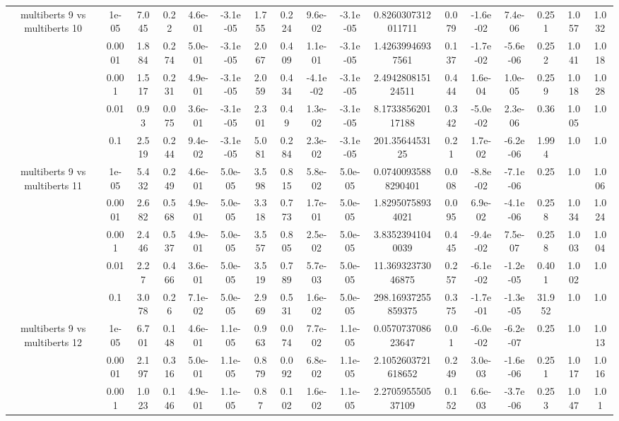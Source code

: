 \begin{tabular}{|c|c|c|c|c|c|c|c|c|c|c|c|c|c|c|c|c|}
\hline
\multirow{5}{*}{multiberts 9 vs multiberts 10} & 1e-05 & 7.045 & 0.22 & 4.6e-01 & -3.1e-05 & 1.755 & 0.224 & 9.6e-02 & -3.1e-05 & 0.8260307312011711 & 0.079 & -1.6e-02 & 7.4e-06 & 0.251 & 1.057 & 1.032 \\
 & 0.0001 & 1.884 & 0.274 & 5.0e-01 & -3.1e-05 & 2.067 & 0.409 & 1.1e-01 & -3.1e-05 & 1.42639946937561 & 0.137 & -1.7e-02 & -5.6e-06 & 0.252 & 1.041 & 1.018 \\
 & 0.001 & 1.517 & 0.231 & 4.9e-01 & -3.1e-05 & 2.059 & 0.434 & -4.1e-02 & -3.1e-05 & 2.494280815124511 & 0.444 & 1.6e-04 & 1.0e-05 & 0.259 & 1.018 & 1.028 \\
 & 0.01 & 0.93 & 0.075 & 3.6e-01 & -3.1e-05 & 2.301 & 0.49 & 1.3e-02 & -3.1e-05 & 8.173385620117188 & 0.342 & -5.0e-02 & 2.3e-06 & 0.36 & 1.005 & 1.0 \\
 & 0.1 & 2.519 & 0.244 & 9.4e-02 & -3.1e-05 & 5.081 & 0.284 & 2.3e-02 & -3.1e-05 & 201.3564453125 & 0.21 & 1.7e-02 & -6.2e-06 & 1.994 & 1.0 & 1.0 \\
\hline
\multirow{5}{*}{multiberts 9 vs multiberts 11} & 1e-05 & 5.432 & 0.249 & 4.6e-01 & 5.0e-05 & 3.598 & 0.815 & 5.8e-02 & 5.0e-05 & 0.07400935888290401 & 0.008 & -8.8e-02 & -7.1e-06 & 0.25 & 1.0 & 1.006 \\
 & 0.0001 & 2.682 & 0.568 & 4.9e-01 & 5.0e-05 & 3.318 & 0.773 & 1.7e-01 & 5.0e-05 & 1.82950758934021 & 0.095 & 6.9e-02 & -4.1e-06 & 0.258 & 1.034 & 1.024 \\
 & 0.001 & 2.446 & 0.537 & 4.9e-01 & 5.0e-05 & 3.557 & 0.805 & 2.5e-02 & 5.0e-05 & 3.83523941040039 & 0.445 & -9.4e-02 & 7.5e-07 & 0.258 & 1.003 & 1.004 \\
 & 0.01 & 2.27 & 0.466 & 3.6e-01 & 5.0e-05 & 3.519 & 0.789 & 5.7e-03 & 5.0e-05 & 11.36932373046875 & 0.257 & -6.1e-02 & -1.2e-05 & 0.401 & 1.002 & 1.0 \\
 & 0.1 & 3.078 & 0.26 & 7.1e-02 & 5.0e-05 & 2.969 & 0.531 & 1.6e-02 & 5.0e-05 & 298.16937255859375 & 0.375 & -1.7e-01 & -1.3e-05 & 31.952 & 1.0 & 1.0 \\
\hline
\multirow{5}{*}{multiberts 9 vs multiberts 12} & 1e-05 & 6.701 & 0.148 & 4.6e-01 & 1.1e-05 & 0.963 & 0.074 & 7.7e-02 & 1.1e-05 & 0.057073708623647 & 0.01 & -6.0e-02 & -6.2e-07 & 0.25 & 1.0 & 1.013 \\
 & 0.0001 & 2.197 & 0.316 & 5.0e-01 & 1.1e-05 & 0.879 & 0.092 & 6.8e-02 & 1.1e-05 & 2.1052603721618652 & 0.249 & 3.0e-03 & -1.6e-06 & 0.251 & 1.017 & 1.016 \\
 & 0.001 & 1.023 & 0.146 & 4.9e-01 & 1.1e-05 & 0.87 & 0.102 & 1.6e-02 & 1.1e-05 & 2.270595550537109 & 0.152 & 6.6e-03 & -3.7e-06 & 0.253 & 1.047 & 1.01 \\

\end{tabular}

